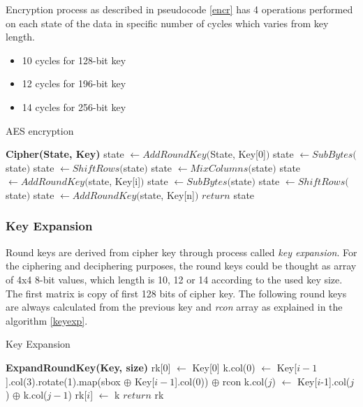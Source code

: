 Encryption process as described in pseudocode \ref{encr} has 4 operations 
performed on each state of the data in specific number of cycles which 
varies from key length.
\begin{itemize}
\item 10 cycles for 128-bit key
\item 12 cycles for 196-bit key
\item 14 cycles for 256-bit key
\end{itemize}

\begin{algorithm}
\caption{AES encryption}
\label{encr}
\begin{algorithmic}
\State \textbf{Cipher(State, Key)}
\State state $\gets AddRoundKey($State, Key[0]$)$
\vspace{0.5em}
    \State state $\gets SubBytes($state$)$
    \State state $\gets ShiftRows($state$)$
    \State state $\gets MixColumns($state$)$
    \State state $\gets AddRoundKey($state, Key[i]$)$
\EndFor
\vspace{0.5em}
\State state $\gets SubBytes($state$)$
\State state $\gets ShiftRows($state$)$
\State state $\gets AddRoundKey($state, Key[n]$)$
\vspace{0.5em}
\State $return$ state
\end{algorithmic}
\end{algorithm}

\subsubsection*{Key Expansion}
Round keys are derived from cipher key through process called \textit{key 
expansion}. For the ciphering and deciphering purposes, the round keys could be 
thought as array of 4x4 8-bit values, which length is 10, 12 or 14 according to 
the used key size. The first matrix is copy of first 128 bits of cipher key. The
following round keys are always calculated from the previous key and 
\textit{rcon} array as explained in the algorithm \ref{keyexp}.

\begin{algorithm}[H]
\caption{Key Expansion}
\label{keyexp}
\begin{algorithmic}
\State \textbf{ExpandRoundKey(Key, size)}
\State rk[0] $\gets$ Key[0]
\vspace{0.5em}
    \State k.col(0) $\gets$ Key[$i-1$].col(3).rotate(1).map(sbox 
	    $\oplus$ Key[$i-1$].col(0)) $\oplus$ rcon
        \State k.col($j$) $\gets$ Key[$i$-1].col($j$) $\oplus$ k.col($j-1$)
    \EndFor
    \State rk[$i$] $\gets$ k
\EndFor
\vspace{0.5em}
\State $return$ rk
\end{algorithmic}
\end{algorithm}


